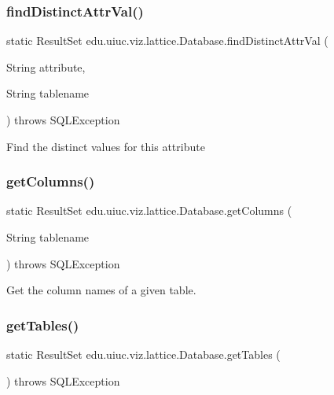 \subsubsection{\texorpdfstring{findDistinctAttrVal()}{findDistinctAttrVal()}}
{\footnotesize\ttfamily static Result\+Set edu.\+uiuc.\+viz.\+lattice.\+Database.\+find\+Distinct\+Attr\+Val (\begin{DoxyParamCaption}\item[{String}]{attribute,  }\item[{String}]{tablename }\end{DoxyParamCaption}) throws S\+Q\+L\+Exception\hspace{0.3cm}{\ttfamily [static]}}

Find the distinct values for this attribute \mbox{\label{classedu_1_1uiuc_1_1viz_1_1lattice_1_1_database_aa3719cbaf0e7b9e83d9d2b5d2e886e71}} 
\subsubsection{\texorpdfstring{getColumns()}{getColumns()}}
{\footnotesize\ttfamily static Result\+Set edu.\+uiuc.\+viz.\+lattice.\+Database.\+get\+Columns (\begin{DoxyParamCaption}\item[{String}]{tablename }\end{DoxyParamCaption}) throws S\+Q\+L\+Exception\hspace{0.3cm}{\ttfamily [static]}}

Get the column names of a given table. \mbox{\label{classedu_1_1uiuc_1_1viz_1_1lattice_1_1_database_a5c81d0679259b6824f1fa55dd24ae568}} 
\subsubsection{\texorpdfstring{getTables()}{getTables()}}
{\footnotesize\ttfamily static Result\+Set edu.\+uiuc.\+viz.\+lattice.\+Database.\+get\+Tables (\begin{DoxyParamCaption}{ }\end{DoxyParamCaption}) throws S\+Q\+L\+Exception\hspace{0.3cm}{\ttfamily [static]}}


